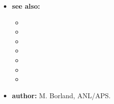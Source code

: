 \begin{itemize}
\begin{itemize}
\begin{itemize}
        \end{itemize}
    \end{itemize}
\item {\bf see also:}
    \begin{itemize}
    \item {}
    \item {}
    \item {}
    \item {}
    \item {}
    \item {}
    \item {}
    \end{itemize}
\item {\bf author:} M. Borland, ANL/APS.
\end{itemize}

